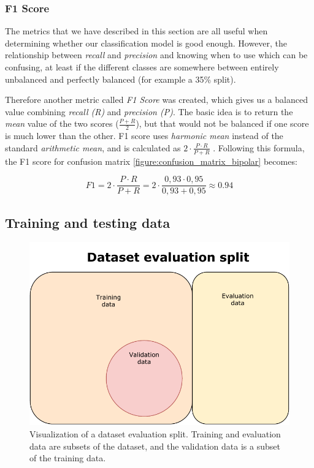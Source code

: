 \newpage

\subsubsection{F1 Score}

The metrics that we have described in this section are all useful when determining whether our classification model is good enough. However, the relationship between \textit{recall} and \textit{precision} and knowing when to use which can be confusing, at least if the different classes are somewhere between entirely unbalanced and perfectly balanced (for example a 35\% split). 

Therefore another metric called \textit{F1 Score} was created, which gives us a balanced value combining \textit{recall (R)} and \textit{precision (P)}. The basic idea is to return the \textit{mean} value of the two scores ($ \frac{P + R}{2} $), but that would not be balanced if one score is much lower than the other. F1 score uses \textit{harmonic mean} instead of the standard \textit{arithmetic mean}, and is calculated as $ 2 \cdot \frac{P \cdot R}{P + R} $ \cite{ml_metrics}. 
Following this formula, the F1 score for confusion matrix \ref{figure:confusion_matrix_bipolar} becomes:

\[
  F1 = 2 \cdot \frac{P \cdot R}{P + R} = 2 \cdot \frac{0,93 \cdot 0,95}{0,93 + 0,95} \approx 0.94
\]

\subsection{Training and testing data}
\begin{figure}[!ht]
  \includegraphics{img/train_test_data.pdf}
  \caption{Visualization of a dataset evaluation split. Training and evaluation data are subsets of the dataset, and the validation data is a subset of the training data.}
  \label{figure:dataset_train_test}
\end{figure}

